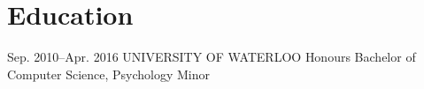 \documentclass{resume-class}
\begin{document}
\vspace{-2.5\parskip}
\section{Education}

\begin{sectionlist}
		
	\education
	{Sep. 2010--Apr. 2016}
	{UNIVERSITY OF WATERLOO}
	{Honours Bachelor of Computer Science, Psychology Minor}
	
\end{sectionlist}
\end{document}
